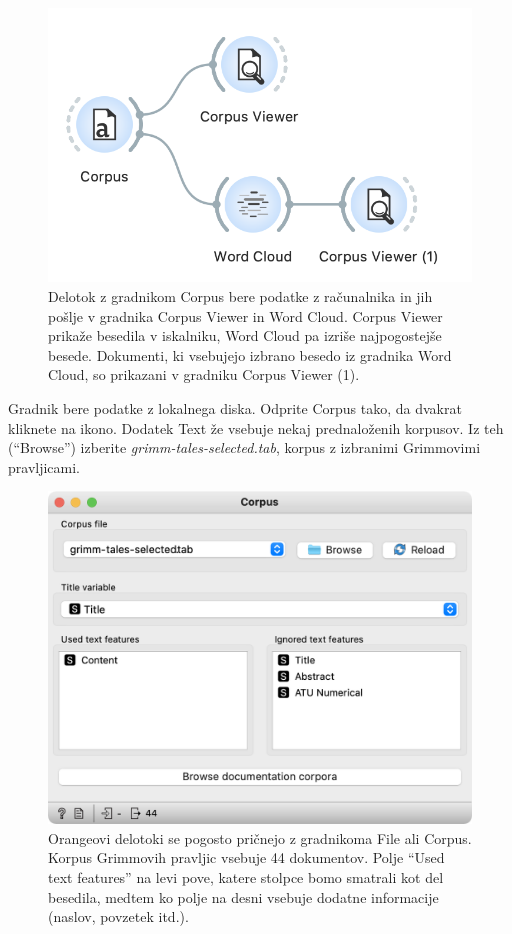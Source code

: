 \begin{figure}[h]
  \centering
  \includegraphics[width=0.9\linewidth]{workflow-ex.png}%
  \caption{Delotok z gradnikom Corpus bere podatke z računalnika in jih pošlje v gradnika Corpus Viewer in Word Cloud. Corpus Viewer prikaže besedila v iskalniku, Word Cloud pa izriše najpogostejše besede. Dokumenti, ki vsebujejo izbrano besedo iz gradnika Word Cloud, so prikazani v gradniku Corpus Viewer (1).}
  \label{fig:workflow-fig2}
\end{figure}

Gradnik  bere podatke z lokalnega diska. Odprite Corpus tako, da dvakrat kliknete na ikono. Dodatek Text že vsebuje nekaj prednaloženih korpusov. Iz teh (“Browse”) izberite \textit{grimm-tales-selected.tab}, korpus z izbranimi Grimmovimi pravljicami. 

\begin{figure}[h]
  \centering
  \includegraphics[width=\linewidth]{corpus.png}%
  \caption{Orangeovi delotoki se pogosto pričnejo z gradnikoma File ali Corpus. Korpus Grimmovih pravljic vsebuje 44 dokumentov. Polje “Used text features” na levi pove, katere stolpce bomo smatrali kot del besedila, medtem ko polje na desni vsebuje dodatne informacije (naslov, povzetek itd.).}
  \label{fig:workflow-fig3}
\end{figure}

